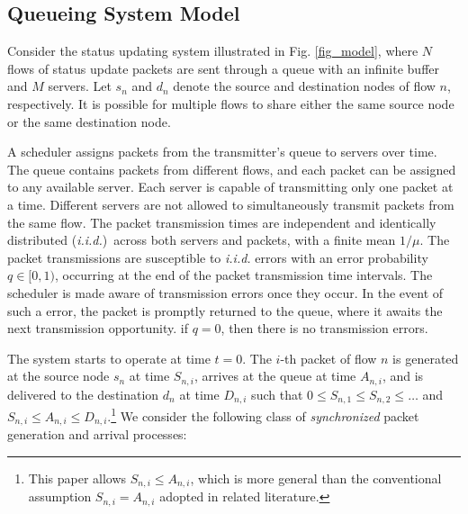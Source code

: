 \subsection{Queueing System Model}\label{sec:queuemodel}

Consider the status updating system illustrated in Fig. \ref{fig_model}, where $N$ flows of status update packets are sent through a queue with an infinite buffer and $M$ servers. Let $s_n$ and $d_n$ denote the source and destination nodes of flow $n$, respectively. It is possible for multiple flows to share either the same source node or the same destination node. 



A scheduler assigns packets from the transmitter's queue to servers over time. The queue contains packets from different flows, and each packet can be assigned to any available server. Each server is capable of transmitting only one packet at a time. Different servers are not allowed to simultaneously transmit packets from the same flow.
The packet transmission times are independent and identically distributed (\emph{i.i.d.})~across both servers and packets, with a finite mean  $1/\mu$. The packet transmissions are susceptible to \emph{i.i.d.} errors with an error probability $q\in[0,1)$, 
occurring at the end of the packet transmission time intervals.
The scheduler is made aware of transmission errors once they occur. In the event of such a error, the packet is promptly returned to the queue, where it awaits the next transmission opportunity. if $q= 0$, then there is no transmission errors. 






The system starts to operate at time $t=0$.  The $i$-th packet of flow $n$ is generated  at the source node $s_n$ at time $S_{n,i}$, arrives at the queue at time $A_{n,i}$, and is delivered to the destination $d_n$ at time $D_{n,i}$ such that $0\leq S_{n,1} \leq S_{n,2}\leq\ldots$ and $S_{n,i}\leq A_{n,i}\leq D_{n,i}$.\footnote{This paper allows $S_{n,i}\leq A_{n,i}$, which is  more general than the conventional assumption $S_{n,i}= A_{n,i}$  adopted in  related literature.} 
We consider the following class of \emph{synchronized} packet generation and arrival processes:

